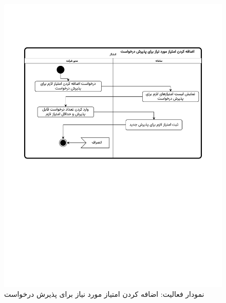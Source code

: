 \begin{figure}[ht!]
	\centering
	\includegraphics[scale=0.8, page=1]{figs/OOD-activity-reqscore.pdf}
	\caption{نمودار فعالیت: اضافه کردن امتیاز مورد نیاز برای پذیرش درخواست}
\end{figure}
\FloatBarrier
\newpage

